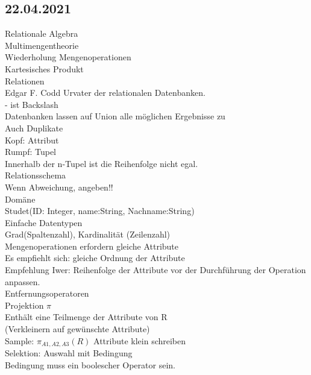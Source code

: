 \documentclass{article}
\begin{document}
	\subsection*{22.04.2021}
	Relationale Algebra \\
	Multimengentheorie \\
	Wiederholung Mengenoperationen \\
	Kartesisches Produkt \\
	Relationen \\
	Edgar F. Codd Urvater der relationalen Datenbanken. \\
	- ist Backslash \\
	Datenbanken lassen auf Union alle möglichen Ergebnisse zu \\
	Auch Duplikate \\
	Kopf: Attribut \\
	Rumpf: Tupel \\
	Innerhalb der n-Tupel ist die Reihenfolge nicht egal. \\
	Relationsschema \\
	Wenn Abweichung, angeben!! \\
	Domäne \\
	Studet(ID: Integer, name:String, Nachname:String) \\
	Einfache Datentypen \\
	Grad(Spaltenzahl), Kardinalität (Zeilenzahl) \\
	Mengenoperationen erfordern gleiche Attribute \\
	Es empfiehlt sich: gleiche Ordnung der Attribute \\
	Empfehlung Iwer: Reihenfolge der Attribute vor der Durchführung der Operation anpassen. \\
	Entfernungsoperatoren \\
	Projektion $\pi$ \\
	Enthält eine Teilmenge der Attribute von R \\
	(Verkleinern auf gewünschte Attribute) \\
	Sample: $\pi_{A1, A2, A3}(R)$
	Attribute klein schreiben \\
	Selektion: Auswahl mit Bedingung \\
	Bedingung muss ein boolescher Operator sein. \\
\end{document}

